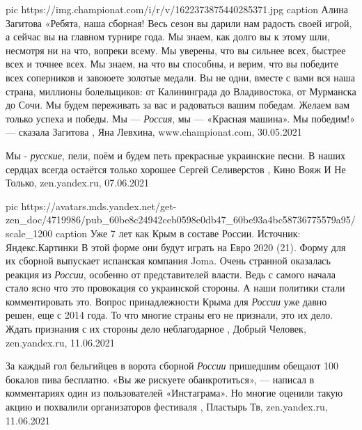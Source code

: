 \ifcmt
  pic https://img.championat.com/i/r/v/1622373875440285371.jpg
	caption Алина Загитова
\fi
«Ребята, наша сборная! Весь сезон вы дарили нам радость своей игрой, а сейчас
вы на главном турнире года. Мы знаем, как долго вы к этому шли, несмотря ни на
что, вопреки всему. Мы уверены, что вы сильнее всех, быстрее всех и точнее
всех. Мы знаем, на что вы способны, и верим, что вы победите всех соперников и
завоюете золотые медали.  Вы не одни, вместе с вами вся наша страна, миллионы
болельщиков: от Калининграда до Владивостока, от Мурманска до Сочи. Мы будем
переживать за вас и радоваться вашим победам. Желаем вам только успеха и
победы. Мы — \emph{Россия}, мы — «Красная машина». Мы победим!» — сказала Загитова
, 
Яна Левхина, www.championat.com, 30.05.2021

Мы - \emph{русские}, пели, поём и будем петь прекрасные украинские песни. В
наших сердцах всегда остаётся только хорошее
Сергей Селиверстов
, 
Кино Вояж И Не Только, zen.yandex.ru, 07.06.2021

\ifcmt
  pic https://avatars.mds.yandex.net/get-zen_doc/4719986/pub_60be8c24942ceb0598e0db47_60be93a4bc58736775579a95/scale_1200
	caption Уже 7 лет как Крым в составе России. Источник: Яндекс.Картинки
\fi
В этой форме они будут играть на Евро 2020 (21). Форму для их сборной выпускает
испанская компания Joma.  Очень странной оказалась реакция из \emph{России},
особенно от представителей власти. Ведь с самого начала стало ясно что это
провокация со украинской стороны. А наши политики стали комментировать это.
Вопрос принадлежности Крыма для \emph{России} уже давно решен, еще с 2014 года.
То что многие страны его не признали, это их дело. Ждать признания с их стороны
дело
неблагодарное
, 
Добрый Человек, zen.yandex.ru, 11.06.2021

За каждый гол бельгийцев в ворота сборной \emph{России} пришедшим обещают 100
бокалов пива бесплатно. «Вы же рискуете обанкротиться», — написал в
комментариях один из пользователей «Инстаграма». Но многие оценили такую акцию
и похвалили организаторов фестиваля
, 
Пластырь Тв, zen.yandex.ru, 11.06.2021

